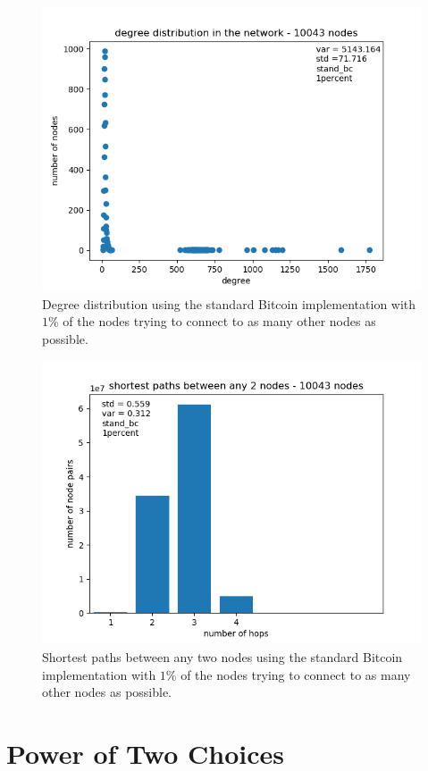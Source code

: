 \documentclass[a4paper, oneside]{discothesis}
\begin{document}
\begin{figure}
    \centering
    \includegraphics[width=.8\columnwidth]{figures/initConnectDistribution/1percent/degree-distribution-10043-nodes.png}
    \caption{Degree distribution using the standard Bitcoin implementation with $1\%$ of the nodes trying to connect to as many other nodes as possible.}
    \label{fig:initConnectDistribution1percentDegree}
\end{figure}

\begin{figure}
    \centering
    \includegraphics[width=.8\columnwidth]{figures/initConnectDistribution/1percent/final-shortest-paths-between-any-nodes-10043-nodes.png}
    \caption{Shortest paths between any two nodes using the standard Bitcoin implementation with $1\%$ of the nodes trying to connect to as many other nodes as possible.}
    \label{fig:initConnectDistribution1percentShortestPath}
\end{figure}

\section{Power of Two Choices}
\end{document}
